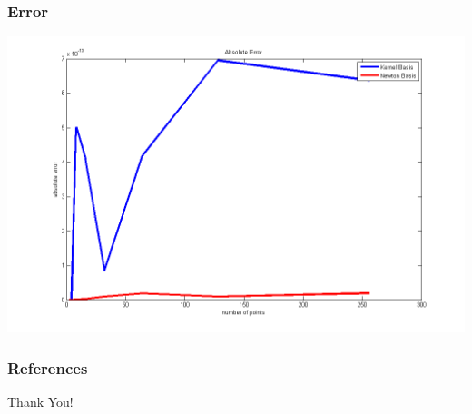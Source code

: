 \documentclass{beamer}
\begin{document}
\begin{frame}
\frametitle{Error}
\includegraphics[scale =.45]{functionError}
\end{frame}

\begin{frame}\frametitle{References}

\end{frame}


\begin{frame}
\Huge{\centerline{Thank You!}}
\end{frame}

\end{document}
